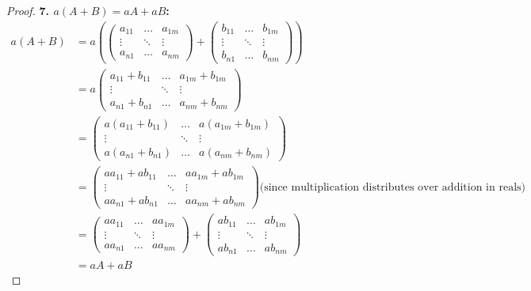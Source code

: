 \documentclass{article}
\begin{document}
\begin{proof}
\textbf{7. $a(A+B)=aA+aB$:}
\begin{align*}
a(A+B) &= a(\begin{pmatrix} a_{11} & \ldots & a_{1m} \\ \vdots &  \ddots & \vdots \\ a_{n1} &  \ldots & a_{nm} \end{pmatrix} + \begin{pmatrix} b_{11} &  \ldots & b_{1m} \\  \vdots & \ddots & \vdots \\ b_{n1} &  \ldots & b_{nm} \end{pmatrix}) \\
&= a\begin{pmatrix} a_{11} + b_{11} & \ldots & a_{1m} + b_{1m} \\ \vdots & \ddots & \vdots \\ a_{n1} + b_{n1} & \ldots & a_{nm} + b_{nm} \end{pmatrix}\\
&= \begin{pmatrix} a(a_{11} + b_{11}) & \ldots & a(a_{1m} + b_{1m}) \\ \vdots & \ddots & \vdots \\ a(a_{n1} + b_{n1}) & \ldots & a(a_{nm} + b_{nm}) \end{pmatrix}\\
&= \begin{pmatrix} aa_{11} + ab_{11} & \ldots & aa_{1m} + ab_{1m} \\ \vdots & \ddots & \vdots \\ aa_{n1} + ab_{n1} & \ldots & aa_{nm} + ab_{nm} \end{pmatrix} \text{(since multiplication distributes over addition in reals)} \\
&= \begin{pmatrix} aa_{11} & \ldots & aa_{1m} \\ \vdots &  \ddots & \vdots \\ aa_{n1} &  \ldots & aa_{nm} \end{pmatrix} + \begin{pmatrix} ab_{11} &  \ldots & ab_{1m} \\  \vdots & \ddots & \vdots \\ ab_{n1} &  \ldots & ab_{nm} \end{pmatrix} \\
&= aA+ aB
\end{align*}
\smallskip


\end{proof}
\end{document}
